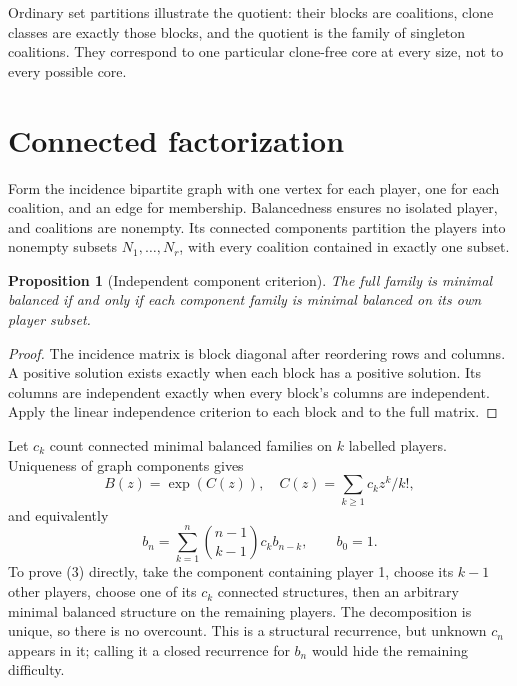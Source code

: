 \documentclass[11pt,a4paper]{article}
\newtheorem{proposition}[theorem]{Proposition}
\begin{document}
Ordinary set partitions illustrate the quotient: their blocks are coalitions, clone classes are exactly those blocks, and the quotient is the family of singleton coalitions. They correspond to one particular clone-free core at every size, not to every possible core.

\section{Connected factorization}
Form the incidence bipartite graph with one vertex for each player, one for each coalition, and an edge for membership. Balancedness ensures no isolated player, and coalitions are nonempty. Its connected components partition the players into nonempty subsets $N_1,\ldots,N_r$, with every coalition contained in exactly one subset.

\begin{proposition}[Independent component criterion]
The full family is minimal balanced if and only if each component family is minimal balanced on its own player subset.
\end{proposition}
\begin{proof}
The incidence matrix is block diagonal after reordering rows and columns. A positive solution exists exactly when each block has a positive solution. Its columns are independent exactly when every block's columns are independent. Apply the linear independence criterion to each block and to the full matrix.
\end{proof}

Let $c_k$ count connected minimal balanced families on $k$ labelled players. Uniqueness of graph components gives
\[
 B(z)=\exp(C(z)),\quad C(z)=\sum_{k\ge1}c_kz^k/k!,
\]
and equivalently
\[
 \boxed{b_n=\sum_{k=1}^n{n-1\choose k-1}c_kb_{n-k}},
 \qquad b_0=1.                                           \tag{3}
\]
To prove (3) directly, take the component containing player 1, choose its $k-1$ other players, choose one of its $c_k$ connected structures, then an arbitrary minimal balanced structure on the remaining players. The decomposition is unique, so there is no overcount. This is a structural recurrence, but unknown $c_n$ appears in it; calling it a closed recurrence for $b_n$ would hide the remaining difficulty.
\end{document}
